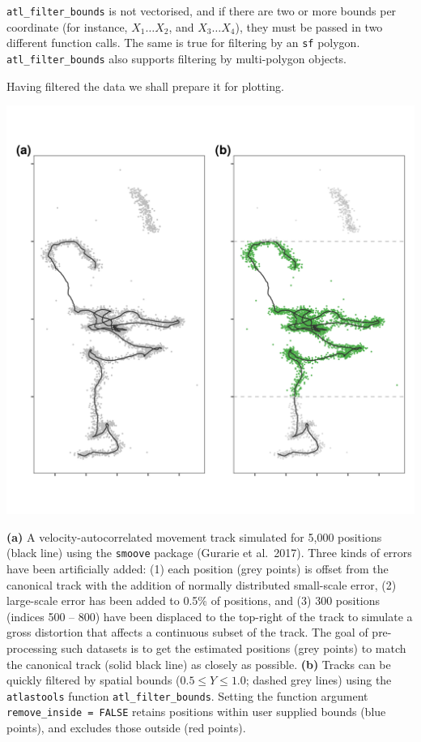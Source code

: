 \documentclass[
]{scrreprt}
\begin{document}
\texttt{atl\_filter\_bounds} is not vectorised, and if there are two or more bounds per coordinate (for instance, \(X_1 \ldots X_2\), and \(X_3 \ldots X_4\)), they must be passed in two different function calls.
The same is true for filtering by an \texttt{sf} polygon. \texttt{atl\_filter\_bounds} also supports filtering by multi-polygon objects.

Having filtered the data we shall prepare it for plotting.

\includegraphics{figures/fig_raw_bounds.png}

\textbf{(a)} A velocity-autocorrelated movement track simulated for 5,000 positions (black line) using the \texttt{smoove} package (Gurarie et al.~2017). Three kinds of errors have been artificially added: (1) each position (grey points) is offset from the canonical track with the addition of normally distributed small-scale error, (2) large-scale error has been added to 0.5\% of positions, and (3) 300 positions (indices 500 -- 800) have been displaced to the top-right of the track to simulate a gross distortion that affects a continuous subset of the track.
The goal of pre-processing such datasets is to get the estimated positions (grey points) to match the canonical track (solid black line) as closely as possible.
\textbf{(b)} Tracks can be quickly filtered by spatial bounds (\(0.5 \leq Y \leq 1.0\); dashed grey lines) using the \texttt{atlastools} function \texttt{atl\_filter\_bounds}. Setting the function argument \texttt{remove\_inside\ =\ FALSE} retains positions within user supplied bounds (blue points), and excludes those outside (red points).
\end{document}
